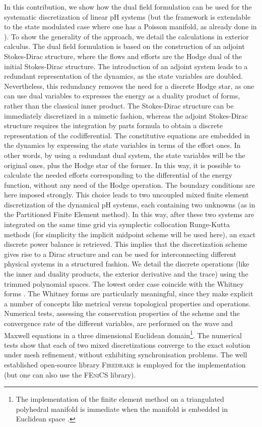 \documentclass{elsarticle}
\newcommand{\revTwo}[1]{{\color{black}#1}}
\newcommand{\fenics}{\textsc{FEniCS}\xspace}
\newcommand{\firedrake}{\textsc{Firedrake}\xspace}
\begin{document}
In this contribution, we show how the dual field formulation can be used for the systematic discretization of linear pH systems (but the framework is extendable to the state modulated case where one has a Poisson manifold, as already done in \cite{zhang2021mass}). To show the generality of the approach, we detail the calculations in exterior calculus. The dual field formulation is based on the construction of an adjoint Stokes-Dirac structure, where the flows and efforts are the Hodge dual of the initial Stokes-Dirac structure. The introduction of an adjoint system leads to a redundant representation of the dynamics, as the state variables are doubled. Nevertheless, this redundancy removes the need for a discrete Hodge star, as one can use dual variables to expresses the energy as a duality product of forms, rather than the classical inner product. The Stokes-Dirac structure can be immediately discretized in a mimetic fashion, whereas the adjoint Stokes-Dirac structure requires the integration by parts formula to obtain a discrete representation of the codifferential. The constitutive equations are embedded in the dynamics by expressing the state variables in terms of the effort ones. In other words, by using a redundant dual system, the state variables will be the original ones, plus the Hodge star of the former. In this way, it is possible to calculate the needed efforts corresponding to the differential of the energy function, without any need of the Hodge operation. The boundary conditions are here imposed strongly. This choice leads to two uncoupled mixed finite element discretization of the dynamical pH systems, each containing two unknowns (as in the Partitioned Finite Element method).  In this way, after these two systems are integrated on the same time grid via symplectic collocation Runge-Kutta methods (for simplicity the implicit midpoint scheme will be used here), an exact discrete power balance is retrieved. This implies that the discretization scheme gives rise to a Dirac structure and can be used for interconnecting different physical systems in a structured fashion. We detail the discrete operations (like the inner and duality products, the exterior derivative and the trace) using the trimmed polynomial spaces. The lowest order case coincide with the Whitney forms \cite{whitney1957}. The Whitney forms are particularly meaningful, since they make explicit a number of concepts  like metrical versus topological properties and operations. Numerical tests, assessing the conservation properties of the scheme and the convergence rate of the different variables, are performed on the wave and Maxwell equations in a three dimensional Euclidean domain\footnote{The implementation of the finite element method on a triangulated polyhedral manifold is immediate when the manifold is embedded in Euclidean space \cite{arnold2018finite}.}. \revTwo{The numerical tests show that each of two mixed discretizations converge to the exact solution under mesh refinement, without exhibiting synchronisation problems.} The well established open-source library \firedrake \cite{rathgeber2017firedrake} is employed for the implementation (but one can also use the \fenics \cite{logg2012} library). \\
\end{document}
